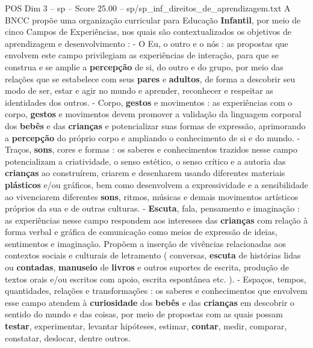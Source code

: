 \begin{textsample}{POS Dim 3 – sp – Score 25.00 – sp/sp\_inf\_direitos\_de\_aprendizagem.txt}
A BNCC propõe uma organização curricular para Educação \textbf{Infantil}, por meio de cinco Campos de Experiências, nos quais são contextualizados os objetivos de aprendizagem e desenvolvimento : - O Eu, o outro e o nós : as propostas que envolvem este campo privilegiam as experiências de interação, para que se construa e se amplie a \textbf{percepção} de si, do outro e do grupo, por meio das relações que se estabelece com seus \textbf{pares} e \textbf{adultos}, de forma a descobrir seu modo de ser, estar e agir no mundo e aprender, reconhecer e respeitar as identidades dos outros. - Corpo, \textbf{gestos} e movimentos : as experiências com o corpo, \textbf{gestos} e movimentos devem promover a validação da linguagem corporal dos \textbf{bebês} e das \textbf{crianças} e potencializar suas formas de expressão, aprimorando a \textbf{percepção} do próprio corpo e ampliando o conhecimento de si e do mundo. - Traços, \textbf{sons}, cores e formas : os saberes e conhecimentos trazidos nesse campo potencializam a criatividade, o senso estético, o senso crítico e a autoria das \textbf{crianças} ao construírem, criarem e desenharem usando diferentes materiais \textbf{plásticos} e/ou gráficos, bem como desenvolvem a expressividade e a sensibilidade ao vivenciarem diferentes \textbf{sons}, ritmos, músicas e demais movimentos artísticos próprios da sua e de outras culturas. - \textbf{Escuta}, fala, pensamento e imaginação : as experiências nesse campo respondem aos interesses das \textbf{crianças} com relação à forma verbal e gráfica de comunicação como meios de expressão de ideias, sentimentos e imaginação.
Propõem a inserção de vivências relacionadas aos contextos sociais e culturais de letramento ( conversas, \textbf{escuta} de histórias lidas ou \textbf{contadas}, \textbf{manuseio} de \textbf{livros} e outros suportes de escrita, produção de textos orais e/ou escritos com apoio, escrita espontânea etc. ). - Espaços, tempos, quantidades, relações e transformações : os saberes e conhecimentos que envolvem esse campo atendem à \textbf{curiosidade} dos \textbf{bebês} e das \textbf{crianças} em descobrir o sentido do mundo e das coisas, por meio de propostas com as quais possam \textbf{testar}, experimentar, levantar hipóteses, estimar, \textbf{contar}, medir, comparar, constatar, deslocar, dentre outros.

\end{textsample}
